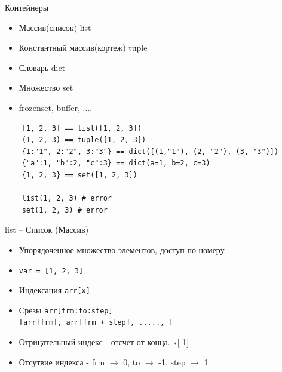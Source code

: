 \documentclass{article}
\begin{document}
\LARGE

\begin{center} Контейнеры \end{center}
\begin{itemize}
	\item Массив(список) list
	\item Константный массив(кортеж) tuple
	\item Словарь dict
	\item Множество set
	\item frozenset, buffer, ....
\end{itemize}
\begin{lstlisting}
	[1, 2, 3] == list([1, 2, 3])
	(1, 2, 3) == tuple([1, 2, 3])
	{1:"1", 2:"2", 3:"3"} == dict([(1,"1"), (2, "2"), (3, "3")])
	{"a":1, "b":2, "c":3} == dict(a=1, b=2, c=3)
	{1, 2, 3} == set([1, 2, 3])

	list(1, 2, 3) # error
	set(1, 2, 3) # error
\end{lstlisting}
\newpage

\begin{center} list – Список (Массив) \end{center}
\begin{itemize}
	\item Упорядоченное множество элементов, доступ по номеру
	\item \lstinline!var = [1, 2, 3]!
	\item Индексация \lstinline!arr[x]!
	\item Срезы 
			\lstinline!arr[frm:to:step]! \\
			\lstinline![arr[frm], arr[frm + step], ....., ]!
	\item Отрицательный индекс - отсчет от конца. x[-1]
	\item Отсутвие индекса - frm $\rightarrow$ 0, to $\rightarrow$ -1, step $\rightarrow$ 1
\end{itemize}
\newpage
\end{document}
